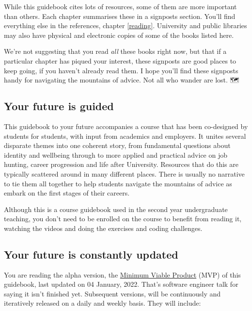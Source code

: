 \documentclass[
]{book}
\begin{document}
While this guidebook cites lots of resources, some of them are more important than others. Each chapter summarises these in a signposts section. You'll find everything else in the references, chapter \ref{reading}. University and public libraries may also have physical and electronic copies of some of the books listed here.

We're not suggesting that you read \emph{all} these books right now, but that if a particular chapter has piqued your interest, these signposts are good places to keep going, if you haven't already read them. I hope you'll find these signposts handy for navigating the mountains of advice. Not all who wander are lost. 🗺️🧭

\hypertarget{study}{%
\subsection{Your future is guided}\label{study}}

This guidebook to your future accompanies a course that has been co-designed by students for students, with input from academics and employers. It unites several disparate themes into one coherent story, from fundamental questions about identity and wellbeing through to more applied and practical advice on job hunting, career progression and life after University. Resources that do this are typically scattered around in many different places. There is usually no narrative to tie them all together to help students navigate the mountains of advice as embark on the first stages of their careers.

Although this is a course guidebook used in the second year undergraduate teaching, you don't need to be enrolled on the course to benefit from reading it, watching the videos and doing the exercises and coding challenges.

\hypertarget{version}{%
\subsection{Your future is constantly updated}\label{version}}

You are reading the alpha version, the \href{https://en.wikipedia.org/wiki/Minimum_viable_product}{Minimum Viable Product} (MVP) of this guidebook, last updated on 04 January, 2022. That's software engineer talk for saying it isn't finished yet. Subsequent versions, will be continuously and iteratively released on a daily and weekly basis. They will include:
\end{document}
